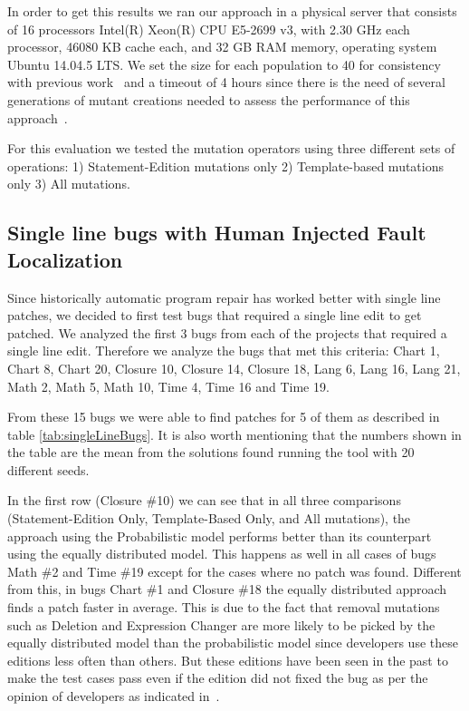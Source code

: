\documentclass[conference]{IEEEtran}
\begin{document}
In order to get this results we ran our approach in a physical server that 
consists of 16 processors Intel(R) Xeon(R) CPU E5-2699 v3, with 2.30 GHz each 
processor, 46080 KB cache each, and 32 GB RAM memory, operating system Ubuntu 
14.04.5 LTS. We set the size for each population to 40 for consistency with 
previous work~\cite{legoues12,kim2013} and a timeout of 4 hours since there is 
the need of several generations of mutant creations needed to assess the 
performance of this approach~\cite{arcuri11}.


For this evaluation we tested the mutation operators using three different sets 
of operations: 1) Statement-Edition mutations only 2) Template-based mutations 
only 3) All mutations.


\subsection{Single line bugs with Human Injected Fault Localization}
Since historically automatic program repair has worked better with single line 
patches, we decided to first test bugs that required a single line edit to get 
patched. We analyzed the first 3 bugs from each of the projects that required a 
single line edit. Therefore we analyze the bugs that met this criteria: Chart 1, 
Chart 8, Chart 20, Closure 10, Closure 14, Closure 18, Lang 6, Lang 16, Lang 21, 
Math 2, Math 5, Math 10, Time 4, Time 16 and Time 19.

From these 15 bugs we were able to find patches for 5 of them as described in table \ref{tab:singleLineBugs}. It is also worth mentioning that the numbers shown in the table are the mean from the solutions found running the tool with 20 different seeds. 

In the first row (Closure \#10) we can see that in all three comparisons (Statement-Edition Only, Template-Based Only, and All mutations), the approach using the Probabilistic model performs better than its counterpart using the equally distributed model. This happens as well in all cases of bugs Math \#2 and Time \#19 except for the cases where no patch was found. Different from this, in bugs Chart \#1 and Closure \#18 the equally distributed approach finds a patch faster in average. This is due to the fact that removal mutations such as Deletion and Expression Changer are more likely to be picked by the equally distributed model than the probabilistic model since developers use these editions less often than others. But these editions have been seen in the past to make the test cases pass even if the edition did not fixed the bug as per the opinion of developers as indicated in~\cite{kim2013}.
\end{document}
